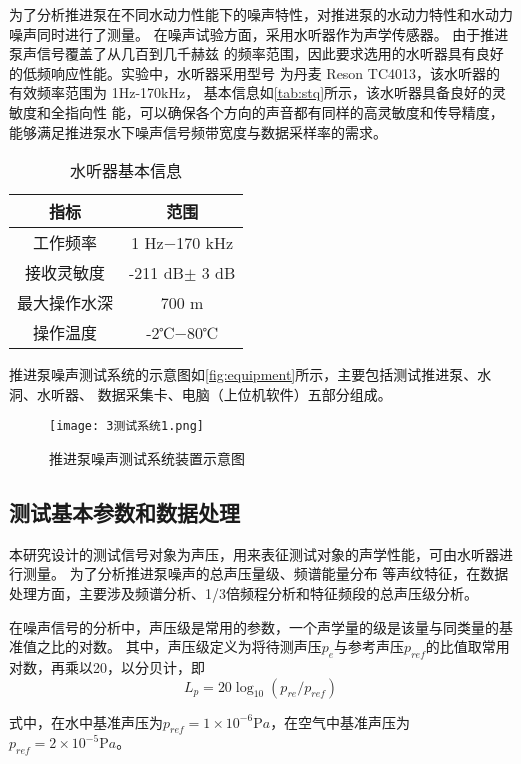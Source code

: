 为了分析推进泵在不同水动力性能下的噪声特性，对推进泵的水动力特性和水动力噪声同时进行了测量。
在噪声试验方面，采用水听器作为声学传感器。
由于推进泵声信号覆盖了从几百到几千赫兹
的频率范围，因此要求选用的水听器具有良好的低频响应性能。实验中，水听器采用型号
为丹麦 Reson TC4013，该水听器的有效频率范围为 1Hz-170kHz，
基本信息如\autoref{tab:stq}所示，该水听器具备良好的灵敏度和全指向性
能，可以确保各个方向的声音都有同样的高灵敏度和传导精度，能够满足推进泵水下噪声信号频带宽度与数据采样率的需求。
\begin{table}[htbp]
    \centering
    \caption{\label{tab:stq}水听器基本信息}
    \begin{tabular}{cc}
     \toprule
     指标&范围\\
     \midrule
     工作频率&1 Hz$- $170 kHz\\
     接收灵敏度&-211 dB$\pm$ 3 dB\\
     最大操作水深&700 m\\
     操作温度&-2℃$- $80℃\\
     \bottomrule
    \end{tabular}
\end{table}

推进泵噪声测试系统的示意图如\autoref{fig:equipment}所示，主要包括测试推进泵、水洞、水听器、
数据采集卡、电脑（上位机软件）五部分组成。
\begin{figure}[htbp]
    \centering
    \texttt{[image: 3测试系统1.png]}
    \caption{\label{fig:equipment}推进泵噪声测试系统装置示意图}
\end{figure}

\subsection{测试基本参数和数据处理}
本研究设计的测试信号对象为声压，用来表征测试对象的声学性能，可由水听器进行测量。
为了分析推进泵噪声的总声压量级、频谱能量分布
等声纹特征，在数据处理方面，主要涉及频谱分析、1/3倍频程分析和特征频段的总声压级分析。

在噪声信号的分析中，声压级是常用的参数，一个声学量的级是该量与同类量的基准值之比的对数。
其中，声压级定义为将待测声压$p_e$与参考声压$p_{ref}$的比值取常用对数，再乘以20，以分贝计，即
\begin{equation}
    \label{equ:p}
    L_{p} = 20\log_{10}{\left(p_{re}/p_{ref}\right )}
\end{equation}

式中，在水中基准声压为$p_{ref}= 1\times 10^{-6} \mathrm{P} a$，在空气中基准声压为$p_{ref}= 2\times 10^{-5} \mathrm{P} a$。
\begin{comment}
同理，振动加速度级也定义为加速度有效值$a_e$与基准加速度$a_{ref}$之比的以10为底的对数，再乘以20，以分贝计，即
\begin{equation}
    \label{equ:a}
    L_{a} = 20\log_{10}{\left(a_{re}/a_{ref}\right )}
\end{equation}
式中，基准加速度值为$a_{ref}= 1\times 10^{-6} \mathrm{m/s^2} $。
\end{comment}

